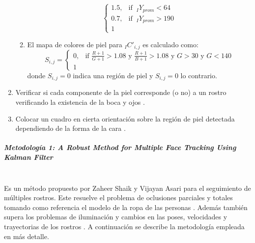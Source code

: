\documentclass[a4paper,openright,12pt]{report}
\begin{document}
\begin{enumerate}[label=(\alph*)]
\begin{framed}
\begin{enumerate}[label=\arabic*.]
\begin{equation}
                    \begin{cases}
                        1.5, & \text{if }\ {}_{I}Y_{prom}<64\\
                        0.7, & \text{if }\ {}_{I}Y_{prom}>190\\
                        1
                    \end{cases}
                \end{equation}
            \item El mapa de colores de piel para ${}_{I}C'_{i,j}$ es calculado
                como:
                \begin{equation}
                    S_{i,j}=
                    \begin{cases}
                        0, & \text{if $\frac{R + 1}{G + 1}>1.08$ y $\frac{R + 1}{B + 1}>1.08$ y $G>30$ y $G<140$}\\
                        1
                    \end{cases}
                \end{equation}
                donde $S_{i,j}=0$ indica una región de piel y $S_{i,j}=0$ lo contrario.
        \end{enumerate}
        \raggedleft\cite{sarkar2012real}
    \end{framed}

    \item Verificar si cada componente de la piel corresponde (o no) a un
        rostro verificando la existencia de la boca y ojos \cite{sarkar2012real}.
    \item Colocar un cuadro en cierta orientación sobre la región de piel
        detectada dependiendo de la forma de la cara \cite{sarkar2012real}.
\end{enumerate}

\subparagraph{Metodología 1:
              A Robust Method for Multiple Face Tracking Using Kalman Filter}\mbox{} \\

Es un método propuesto por Zaheer Shaik y Vijayan Asari para el seguimiento de
múltiples rostros. Este resuelve el problema de oclusiones parciales y totales 
tomando como referencia el modelo de la ropa de las personas \cite{shaik2007robust}. Además también
supera los problemas de iluminación y cambios en las poses, velocidades y
trayectorias de los rostros \cite{shaik2007robust}. A continuación se describe la metodología empleada 
en más detalle.\\
\end{document}
